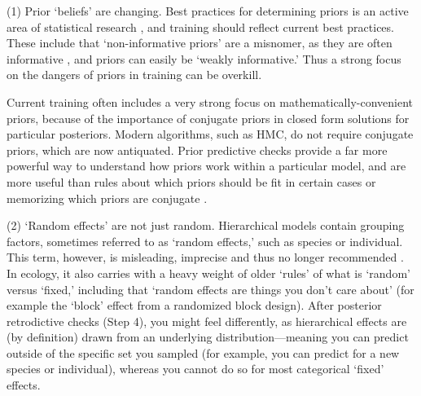 \documentclass[11pt]{article}
\begin{document}
{(1) Prior `beliefs' are changing. Best practices for determining priors is an active area of statistical research \citep{BDA,regotherstories,betanprior}, and training should reflect current best practices. These include that `non-informative priors' are a misnomer, as they are often informative  \citep{lemoine2019}, and priors can easily be `weakly informative.' Thus a strong focus on the dangers of priors in training can be overkill. %

Current training often includes a very strong focus on mathematically-convenient priors, because of the importance of conjugate priors in closed form solutions for particular posteriors. Modern algorithms, such as HMC, do not require conjugate priors, which are now antiquated. Prior predictive checks provide a far more powerful way to understand how priors work within a particular model, and are more useful than rules about which priors should be fit in certain cases or memorizing which priors are conjugate \citep{betanprior}. %

(2) `Random effects' are not just random. Hierarchical models contain grouping factors, sometimes referred to as `random effects,' such as species or individual. This term, however, is misleading, imprecise and thus no longer recommended \citep{gelmanhill}. In ecology, it also carries with a heavy weight of older `rules' of what is `random' versus `fixed,' including that `random effects are things you don't care about' (for example the `block' effect from a randomized block design). After posterior retrodictive checks (Step 4), you might feel differently, as hierarchical effects are (by definition) drawn from an underlying distribution---meaning you can predict outside of the specific set you sampled (for example, you can predict for a new species or individual), whereas you cannot do so for most categorical `fixed' effects.

}
\end{document}
